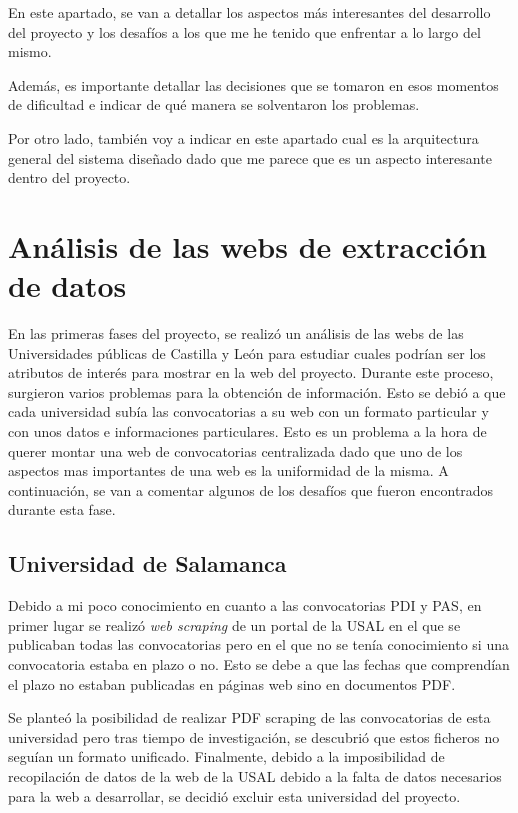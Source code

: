 
En este apartado, se van a detallar los aspectos más interesantes del desarrollo del proyecto y los desafíos a los que me he tenido que enfrentar a lo largo del mismo. 

Además, es importante detallar las decisiones que se tomaron en esos momentos de dificultad e indicar de qué manera se solventaron los problemas.

Por otro lado, también voy a indicar en este apartado cual es la arquitectura general del sistema diseñado dado que me parece que es un aspecto interesante dentro del proyecto.

\section{Análisis de las webs de extracción de datos}
En las primeras fases del proyecto, se realizó un análisis de las webs de las Universidades públicas de Castilla y León para estudiar cuales podrían ser los atributos de interés para mostrar en la web del proyecto. Durante este proceso, surgieron varios problemas para la obtención de información. Esto se debió a que cada universidad subía las convocatorias a su web con un formato particular y con unos datos e informaciones particulares. Esto es un problema a la hora de querer montar una web de convocatorias centralizada dado que uno de los aspectos mas importantes de una web es la uniformidad de la misma. A continuación, se van a comentar algunos de los desafíos que fueron encontrados durante esta fase.

\subsection{Universidad de Salamanca}
Debido a mi poco conocimiento en cuanto a las convocatorias PDI y PAS, en primer lugar se realizó \textit{web scraping} de un portal de la USAL en el que se publicaban todas las convocatorias pero en el que no se tenía conocimiento si una convocatoria estaba en plazo o no. Esto se debe a que las fechas que comprendían el plazo no estaban publicadas en páginas web sino en documentos PDF. 

Se planteó la posibilidad de realizar PDF scraping de las convocatorias de esta universidad pero tras tiempo de investigación, se descubrió que estos ficheros no seguían un formato unificado.  Finalmente, debido a la imposibilidad de recopilación de datos de la web de la USAL \cite{usal:latex} debido a la falta de datos necesarios para la web a desarrollar, se decidió excluir esta universidad del proyecto.

